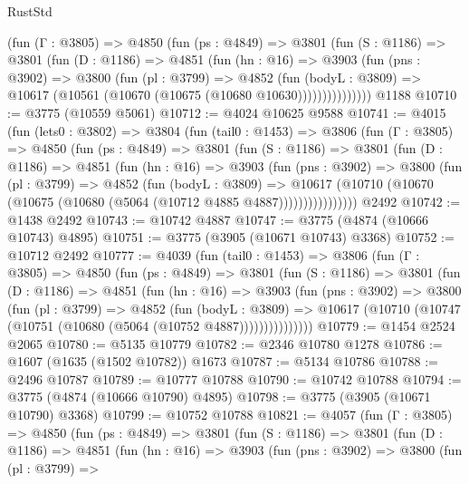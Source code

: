 \begin{lexlean}{RustStd}
\begin{coremodule}
          (fun (Γ : @3805) =>
          @4850
            (fun (ps : @4849) =>
            @3801
              (fun (S : @1186) =>
              @3801
                (fun (D : @1186) =>
                @4851
                  (fun (hn : @16) =>
                  @3903
                    (fun (pns : @3902) =>
                    @3800
                      (fun (pl : @3799) =>
                      @4852
                        (fun (bodyL : @3809) =>
                        @10617 (@10561 (@10670 (@10675 (@10680 @10630)))))))))))))))
    @1188
@10710 := @3775 (@10559 @5061)
@10712 := @4024 @10625 @9588
@10741 := @4015
    (fun (lets0 : @3802) =>
    @3804
      (fun (tail0 : @1453) =>
      @3806
        (fun (Γ : @3805) =>
        @4850
          (fun (ps : @4849) =>
          @3801
            (fun (S : @1186) =>
            @3801
              (fun (D : @1186) =>
              @4851
                (fun (hn : @16) =>
                @3903
                  (fun (pns : @3902) =>
                  @3800
                    (fun (pl : @3799) =>
                    @4852
                      (fun (bodyL : @3809) =>
                      @10617
                        (@10710 (@10670 (@10675 (@10680 (@5064 (@10712 @4885 @4887))))))))))))))))
    @2492
@10742 := @1438 @2492
@10743 := @10742 @4887
@10747 := @3775 (@4874 (@10666 @10743) @4895)
@10751 := @3775 (@3905 (@10671 @10743) @3368)
@10752 := @10712 @2492
@10777 := @4039
    (fun (tail0 : @1453) =>
    @3806
      (fun (Γ : @3805) =>
      @4850
        (fun (ps : @4849) =>
        @3801
          (fun (S : @1186) =>
          @3801
            (fun (D : @1186) =>
            @4851
              (fun (hn : @16) =>
              @3903
                (fun (pns : @3902) =>
                @3800
                  (fun (pl : @3799) =>
                  @4852
                    (fun (bodyL : @3809) =>
                    @10617 (@10710 (@10747 (@10751 (@10680 (@5064 (@10752 @4887)))))))))))))))
@10779 := @1454 @2524 @2065
@10780 := @5135 @10779
@10782 := @2346 @10780 @1278
@10786 := @1607 (@1635 (@1502 @10782)) @1673
@10787 := @5134 @10786
@10788 := @2496 @10787
@10789 := @10777 @10788
@10790 := @10742 @10788
@10794 := @3775 (@4874 (@10666 @10790) @4895)
@10798 := @3775 (@3905 (@10671 @10790) @3368)
@10799 := @10752 @10788
@10821 := @4057
    (fun (Γ : @3805) =>
    @4850
      (fun (ps : @4849) =>
      @3801
        (fun (S : @1186) =>
        @3801
          (fun (D : @1186) =>
          @4851
            (fun (hn : @16) =>
            @3903
              (fun (pns : @3902) =>
              @3800
                (fun (pl : @3799) =>

\end{coremodule}
\end{lexlean}
